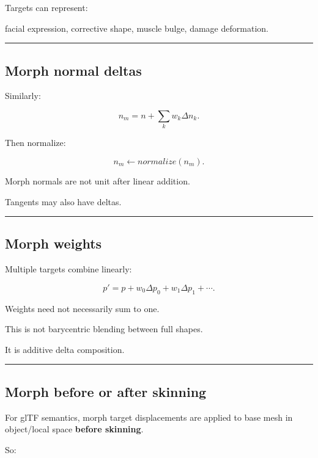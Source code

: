 Targets can represent:

facial expression, corrective shape, muscle bulge, damage deformation.

\begin{center}\rule{0.5\linewidth}{0.5pt}\end{center}

\subsection{Morph normal deltas}\label{04-visual-computing-ii-ch041-morph-normal-deltas}

Similarly:

\[
n_m=
n+
\sum_kw_k\Delta n_k.
\]

Then normalize:

\[
\boxed{
n_m\leftarrow
normalize(n_m).
}
\]

Morph normals are not unit after linear addition.

Tangents may also have deltas.

\begin{center}\rule{0.5\linewidth}{0.5pt}\end{center}

\subsection{Morph weights}\label{04-visual-computing-ii-ch041-morph-weights}

Multiple targets combine linearly:

\[
p'
=
p+
w_0\Delta p_0
+
w_1\Delta p_1
+\cdots.
\]

Weights need not necessarily sum to one.

This is not barycentric blending between full shapes.

It is additive delta composition.

\begin{center}\rule{0.5\linewidth}{0.5pt}\end{center}

\subsection{Morph before or after skinning}\label{04-visual-computing-ii-ch041-morph-before-or-after-skinning}

For glTF semantics, morph target displacements are applied to base mesh in object/local space \textbf{before skinning}.

So:

